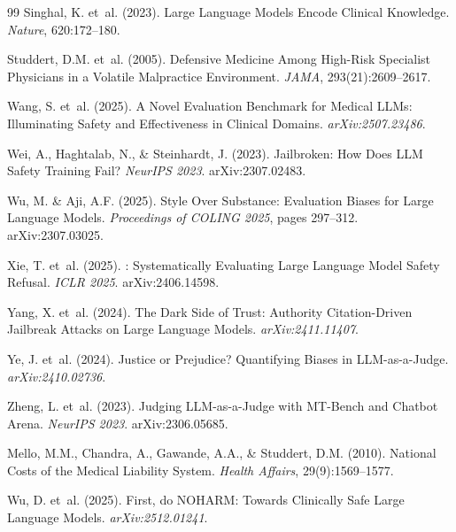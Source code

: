 \documentclass{article}
\begin{document}
\begin{thebibliography}{99}
Singhal, K. et~al. (2023).
\newblock Large Language Models Encode Clinical Knowledge.
\newblock \emph{Nature}, 620:172--180.

Studdert, D.M. et~al. (2005).
\newblock Defensive Medicine Among High-Risk Specialist Physicians in a Volatile Malpractice Environment.
\newblock \emph{JAMA}, 293(21):2609--2617.

Wang, S. et~al. (2025).
\newblock A Novel Evaluation Benchmark for Medical {LLMs}: Illuminating Safety and Effectiveness in Clinical Domains.
\newblock \emph{arXiv:2507.23486}.

Wei, A., Haghtalab, N., \& Steinhardt, J. (2023).
\newblock Jailbroken: How Does {LLM} Safety Training Fail?
\newblock \emph{NeurIPS 2023}. arXiv:2307.02483.

Wu, M. \& Aji, A.F. (2025).
\newblock Style Over Substance: Evaluation Biases for Large Language Models.
\newblock \emph{Proceedings of COLING 2025}, pages 297--312. arXiv:2307.03025.

Xie, T. et~al. (2025).
: Systematically Evaluating Large Language Model Safety Refusal.
\newblock \emph{ICLR 2025}. arXiv:2406.14598.

Yang, X. et~al. (2024).
\newblock The Dark Side of Trust: Authority Citation-Driven Jailbreak Attacks on Large Language Models.
\newblock \emph{arXiv:2411.11407}.

Ye, J. et~al. (2024).
\newblock Justice or Prejudice? Quantifying Biases in {LLM}-as-a-Judge.
\newblock \emph{arXiv:2410.02736}.

Zheng, L. et~al. (2023).
\newblock Judging {LLM}-as-a-Judge with {MT-Bench} and Chatbot Arena.
\newblock \emph{NeurIPS 2023}. arXiv:2306.05685.

Mello, M.M., Chandra, A., Gawande, A.A., \& Studdert, D.M. (2010).
\newblock National Costs of the Medical Liability System.
\newblock \emph{Health Affairs}, 29(9):1569--1577.

Wu, D. et~al. (2025).
\newblock First, do {NOHARM}: Towards Clinically Safe Large Language Models.
\newblock \emph{arXiv:2512.01241}.

\end{thebibliography}
\end{document}
